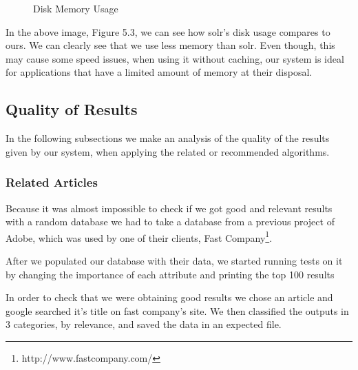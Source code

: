\begin{figure}[h]
\centering
\caption{Disk Memory Usage}

\label{tikz}
\end{figure}

In the above image, Figure 5.3, we can see how solr's disk usage compares to ours. We can clearly see that we use less memory than solr. Even though, this may cause some speed issues, when using it without caching, our system is ideal for applications that have a limited amount of memory at their disposal.
\subsection{Quality of Results}
\label{sec:quality-of-results}
In the following subsections we make an analysis of the quality of the results given by our system, when applying the related or recommended algorithms.

\subsubsection{Related Articles}
\label{sec:related-articles}
Because it was almost impossible to check if we got good and relevant results with a random database we had to take a database from a previous project of Adobe, which was used by one of their clients, Fast Company\footnote{http://www.fastcompany.com/}. 

After we populated our database with their data, we started running tests on it by changing the importance of each attribute and printing the top 100 results

In order to check that we were obtaining  good results we chose an article and google searched it's title on fast company’s site. We then classified the outputs in 3 categories, by relevance, and saved the data in an expected file.

